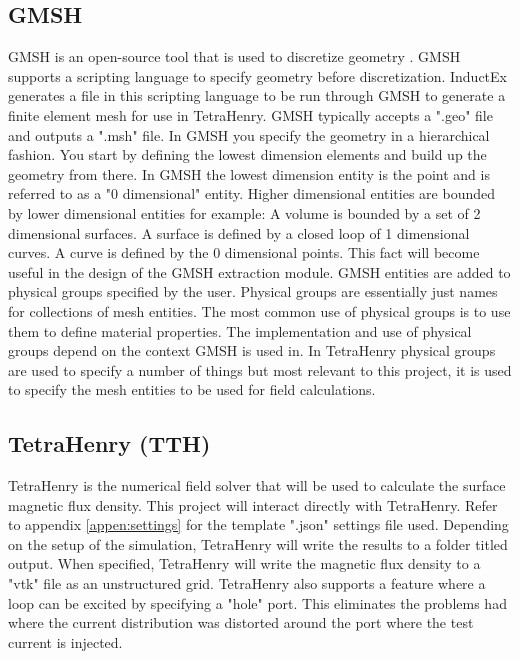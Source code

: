 \subsection{GMSH}
GMSH is an open-source tool that is used to discretize geometry \cite{GMSH}. GMSH supports a scripting language to specify geometry before discretization. InductEx generates a file in this scripting language to be run through GMSH to generate a finite element mesh for use in TetraHenry. GMSH typically accepts a ".geo" file and outputs a ".msh" file. In GMSH you specify the geometry in a hierarchical fashion. You start by defining the lowest dimension elements and build up the geometry from there. In GMSH the lowest dimension entity is the point and is referred to as a "0 dimensional" entity. Higher dimensional entities are bounded by lower dimensional entities for example: A volume is bounded by a set of 2 dimensional surfaces. A surface is defined by a closed loop of 1 dimensional curves. A curve is defined by the 0 dimensional points. This fact will become useful in the design of the GMSH extraction module. GMSH entities are added to physical groups specified by the user. Physical groups are essentially just names for collections of mesh entities. The most common use of physical groups is to use them to define material properties. The implementation and use of physical groups depend on the context GMSH is used in. In TetraHenry physical groups are used to specify a number of things but most relevant to this project, it is used to specify the mesh entities to be used for field calculations. \par

\subsection{TetraHenry (TTH)}
TetraHenry is the numerical field solver that will be used to calculate the surface magnetic flux density. This project will interact directly with TetraHenry. Refer to appendix \ref{appen:settings} for the template ".json" settings file used. Depending on the setup of the simulation, TetraHenry will write the results to a folder titled output. When specified, TetraHenry will write the magnetic flux density to a "vtk" file as an unstructured grid. TetraHenry also supports a feature where a loop can be excited by specifying a "hole" port. This eliminates the problems \cite{fluxNoiseSquidsStevenAnton} had where the current distribution was distorted around the port where the test current is injected. 


